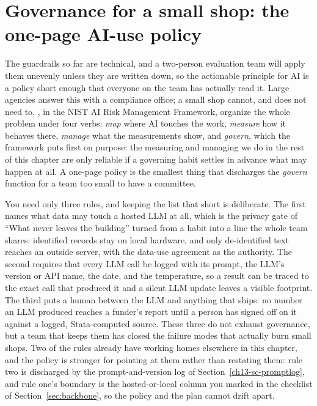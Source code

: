 \documentclass[
    a4paper,
    fontsize=10pt,
    twoside=true,
    numbers=noenddot,
]{kaobook}
\begin{document}
\section{Governance for a small shop: the one-page AI-use policy}\label{sec:ch13-governance}
The guardrails so far are technical, and a two-person evaluation team will apply them unevenly unless they are written down, so the actionable principle for AI is a policy short enough that everyone on the team has actually read it. Large agencies answer this with a compliance office; a small shop cannot, and does not need to. \textcite{tabassi2023airmf}, in the NIST AI Risk Management Framework, organize the whole problem under four verbs: \emph{map} where AI touches the work, \emph{measure} how it behaves there, \emph{manage} what the measurements show, and \emph{govern}, which the framework puts first on purpose: the measuring and managing we do in the rest of this chapter are only reliable if a governing habit settles in advance what may happen at all. A one-page policy is the smallest thing that discharges the \emph{govern} function for a team too small to have a committee.

You need only three rules, and keeping the list that short is deliberate. The first names what data may touch a hosted LLM at all, which is the privacy gate of \enquote{What never leaves the building} turned from a habit into a line the whole team shares: identified records stay on local hardware, and only de-identified text reaches an outside server, with the data-use agreement as the authority. The second requires that every LLM call be logged with its prompt, the LLM's version or API name, the date, and the temperature, so a result can be traced to the exact call that produced it and a silent LLM update leaves a visible footprint. The third puts a human between the LLM and anything that ships: no number an LLM produced reaches a funder's report until a person has signed off on it against a logged, Stata-computed source. These three do not exhaust governance, but a team that keeps them has closed the failure modes that actually burn small shops. Two of the rules already have working homes elsewhere in this chapter, and the policy is stronger for pointing at them rather than restating them: rule two is discharged by the prompt-and-version log of Section~\ref{ch13-sc-promptlog}, and rule one's boundary is the hosted-or-local column you marked in the checklist of Section~\ref{sec:backbone}, so the policy and the plan cannot drift apart.
\end{document}
